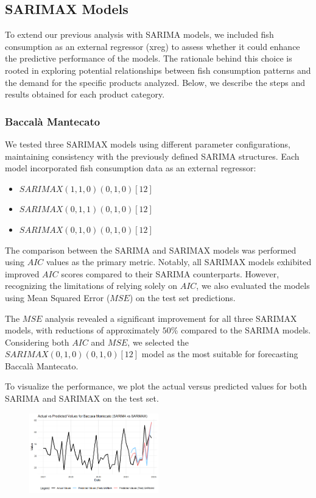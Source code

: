 \documentclass[10pt,twocolumn,letterpaper]{article}
\begin{document}
\subsection{SARIMAX Models}
To extend our previous analysis with SARIMA models, we included fish consumption as an external regressor (xreg) to assess whether it could enhance the predictive performance of the models. The rationale behind this choice is rooted in exploring potential relationships between fish consumption patterns and the demand for the specific products analyzed. Below, we describe the steps and results obtained for each product category.

\subsubsection{Baccalà Mantecato}

We tested three SARIMAX models using different parameter configurations, maintaining consistency with the previously defined SARIMA structures. Each model incorporated fish consumption data as an external regressor:
\begin{itemize}
    \item $SARIMAX(1,1,0)(0,1,0)[12]$
    \item $SARIMAX(0,1,1)(0,1,0)[12]$
    \item $SARIMAX(0,1,0)(0,1,0)[12]$
\end{itemize}

The comparison between the SARIMA and SARIMAX models was performed using $AIC$ values as the primary metric. Notably, all SARIMAX models exhibited improved $AIC$ scores compared to their SARIMA counterparts. However, recognizing the limitations of relying solely on $AIC$, we also evaluated the models using Mean Squared Error ($MSE$) on the test set predictions.

The $MSE$ analysis revealed a significant improvement for all three SARIMAX models, with reductions of approximately $50$\% compared to the SARIMA models. Considering both $AIC$ and $MSE$, we selected the $SARIMAX(0,1,0)(0,1,0)[12]$ model as the most suitable for forecasting Baccalà Mantecato.

To visualize the performance, we plot the actual versus predicted values for both SARIMA and SARIMAX on the test set. 
\begin{figure}[H]
    \centering
    \includegraphics[width=0.5\textwidth]{PlotsBEFD/M_COMPARE_SARIMAX_SARIMA_TEST_PRED.png} 
    \caption{}
    \label{fig:M_COMPARE_SARIMAX_SARIMA_TEST_PRED}
\end{figure}
\end{document}
